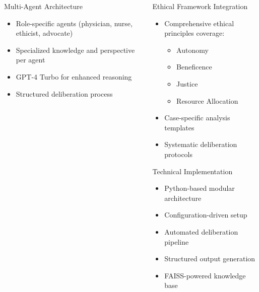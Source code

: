 \documentclass[final]{beamer}
\begin{document}
\begin{frame}[t]
\begin{columns}[t]
\begin{column}{0.32\textwidth}
        \begin{block}{Multi-Agent Architecture}
            \begin{itemize}
                \item Role-specific agents (physician, nurse, ethicist, advocate)
                \item Specialized knowledge and perspective per agent
                \item GPT-4 Turbo for enhanced reasoning
                \item Structured deliberation process
            \end{itemize}
        \end{block}
    \end{column}
    
    \begin{column}{0.32\textwidth}
        \begin{block}{Ethical Framework Integration}
            \begin{itemize}
                \item Comprehensive ethical principles coverage:
                \begin{itemize}
                    \item Autonomy
                    \item Beneficence
                    \item Justice
                    \item Resource Allocation
                \end{itemize}
                \item Case-specific analysis templates
                \item Systematic deliberation protocols
            \end{itemize}
        \end{block}
        
        \begin{block}{Technical Implementation}
            \begin{itemize}
                \item Python-based modular architecture
                \item Configuration-driven setup
                \item Automated deliberation pipeline
                \item Structured output generation
                \item FAISS-powered knowledge base
            \end{itemize}
        \end{block}
        

\end{column}
\end{columns}
\end{frame}
\end{document}
